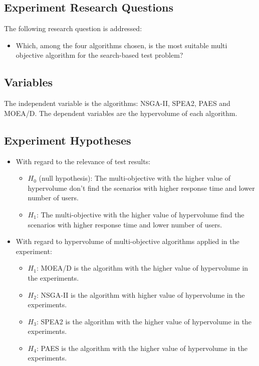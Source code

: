 \documentclass[espaco=umemeio,chapter=TITLE,twoside,openright]{abnt}
\begin{document}
\subsection{Experiment Research Questions}

The following research question is addressed:
\begin{itemize}
\item Which, among the four algorithms chosen, is the most suitable multi objective algorithm for the search-based test problem?
\end{itemize}

\subsection{Variables}

The independent variable is the algorithms: NSGA-II, SPEA2, PAES and MOEA/D. The dependent variables are the hypervolume of each algorithm.

\subsection{Experiment Hypotheses}

\begin{itemize}
\item With regard to the relevance of test results:
\begin{itemize}
\item $H_{0}$ (null hypothesis): The multi-objective with the higher value of hypervolume don't find the scenarios with higher response time and lower number of users.
\item $H_{1}$: The multi-objective with  the higher value of hypervolume find the scenarios with higher response time and lower number of users.
\end{itemize}
\end{itemize}

\begin{itemize}
\item With regard to hypervolume of multi-objective algorithms applied in the experiment:
\begin{itemize}
\item $H_{1}$: MOEA/D is the algorithm with the higher value of hypervolume in the experiments.
\item $H_{2}$: NSGA-II is the algorithm with higher value of hypervolume in the experiments.
\item $H_{3}$: SPEA2 is the algorithm with the higher value of hypervolume in the experiments.
\item $H_{4}$: PAES is the algorithm with the higher value of hypervolume in the experiments.
\end{itemize}
\end{itemize}
\end{document}
